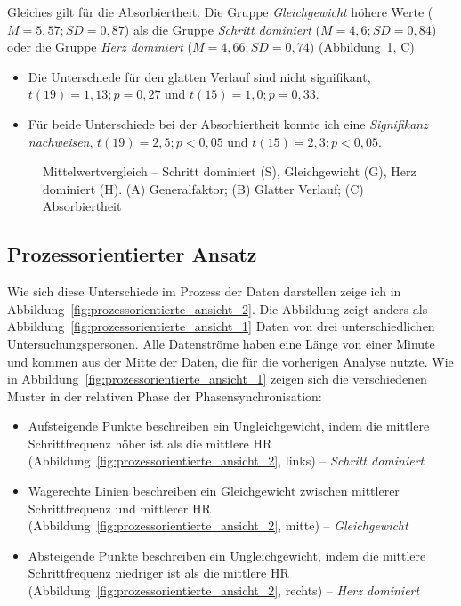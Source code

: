 Gleiches gilt für die Absorbiertheit. Die Gruppe \emph{Gleichgewicht} höhere Werte ($M = 5{,}57; SD = 0{,}87$) als die Gruppe \emph{Schritt dominiert} ($M = 4{,}6; SD = 0{,}84$) oder die Gruppe \emph{Herz dominiert} ($M = 4{,}66; SD = 0{,}74$) (Abbildung~\ref{fig:mittelwert_vergleich}, C)

\begin{itemize}

	\item Die Unterschiede für den glatten Verlauf sind nicht signifikant, $t(19) = 1{,}13; p = 0{,}27$ und $t(15) = 1{,}0; p = 0{,}33$.

	\item Für beide Unterschiede bei der Absorbiertheit konnte ich eine \emph{Signifikanz nachweisen}, $t(19) = 2{,}5; p < 0{,}05$ und $t(15) = 2{,}3; p < 0{,}05$.

\end{itemize}

\begin{figure}[thb!]
	
	\caption[Mittelwertvergleich -- Schritt dominiert, Gleichgewicht, Herz dominiert]{Mittelwertvergleich -- Schritt dominiert (S), Gleichgewicht (G), Herz dominiert (H). (A) Generalfaktor; (B) Glatter Verlauf; (C) Absorbiertheit}
	\label{fig:mittelwert_vergleich}
\end{figure}


\subsection{Prozessorientierter Ansatz} %
\label{sub:prozessorientierter_ansatz_5_3}

Wie sich diese Unterschiede im Prozess der Daten darstellen zeige ich in Abbildung~\ref{fig:prozessorientierte_ansicht_2}. Die Abbildung zeigt anders als Abbildung~\ref{fig:prozessorientierte_ansicht_1} Daten von drei unterschiedlichen Untersuchungspersonen. Alle Datenströme haben eine Länge von einer Minute und kommen aus der Mitte der Daten, die für die vorherigen Analyse nutzte. Wie in Abbildung~\ref{fig:prozessorientierte_ansicht_1} zeigen sich die verschiedenen Muster in der relativen Phase der Phasensynchronisation:
\begin{itemize}
	
	\item Aufsteigende Punkte beschreiben ein Ungleichgewicht, indem die mittlere Schrittfrequenz höher ist als die mittlere \ac{HR} (Abbildung~\ref{fig:prozessorientierte_ansicht_2}, links) -- \emph{Schritt dominiert}
	
	\item Wagerechte Linien beschreiben ein Gleichgewicht zwischen mittlerer Schrittfrequenz und mittlerer \ac{HR} (Abbildung~\ref{fig:prozessorientierte_ansicht_2}, mitte) -- \emph{Gleichgewicht}
	
	\item Absteigende Punkte beschreiben ein Ungleichgewicht, indem die mittlere Schrittfrequenz niedriger ist als die mittlere \ac{HR} (Abbildung~\ref{fig:prozessorientierte_ansicht_2}, rechts) -- \emph{Herz dominiert}
\end{itemize} 

